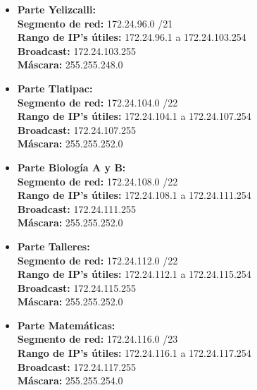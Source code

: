 \begin{itemize}[leftmargin=*]
    \item \textbf{Parte Yelizcalli:} \\
    \textbf{Segmento de red:} 172.24.96.0 /21 \\
    \textbf{Rango de IP's útiles:} 172.24.96.1 a 172.24.103.254 \\
    \textbf{Broadcast:} 172.24.103.255 \\
    \textbf{Máscara:} 255.255.248.0 
    \vspace{5pt}

    \item \textbf{Parte Tlatipac:} \\
    \textbf{Segmento de red:} 172.24.104.0 /22 \\
    \textbf{Rango de IP's útiles:} 172.24.104.1 a 172.24.107.254 \\
    \textbf{Broadcast:} 172.24.107.255 \\
    \textbf{Máscara:} 255.255.252.0 
    \vspace{5pt}

    \item \textbf{Parte Biología A y B:} \\
    \textbf{Segmento de red:} 172.24.108.0 /22 \\
    \textbf{Rango de IP's útiles:} 172.24.108.1 a 172.24.111.254 \\
    \textbf{Broadcast:} 172.24.111.255 \\
    \textbf{Máscara:} 255.255.252.0 
    \vspace{5pt}

    \item \textbf{Parte Talleres:} \\
    \textbf{Segmento de red:} 172.24.112.0 /22 \\
    \textbf{Rango de IP's útiles:} 172.24.112.1 a 172.24.115.254 \\
    \textbf{Broadcast:} 172.24.115.255 \\
    \textbf{Máscara:} 255.255.252.0 
    \vspace{5pt}

    \item \textbf{Parte Matemáticas:} \\
    \textbf{Segmento de red:} 172.24.116.0 /23 \\
    \textbf{Rango de IP's útiles:} 172.24.116.1 a 172.24.117.254 \\
    \textbf{Broadcast:} 172.24.117.255 \\
    \textbf{Máscara:} 255.255.254.0 
    \vspace{5pt}


\end{itemize}
